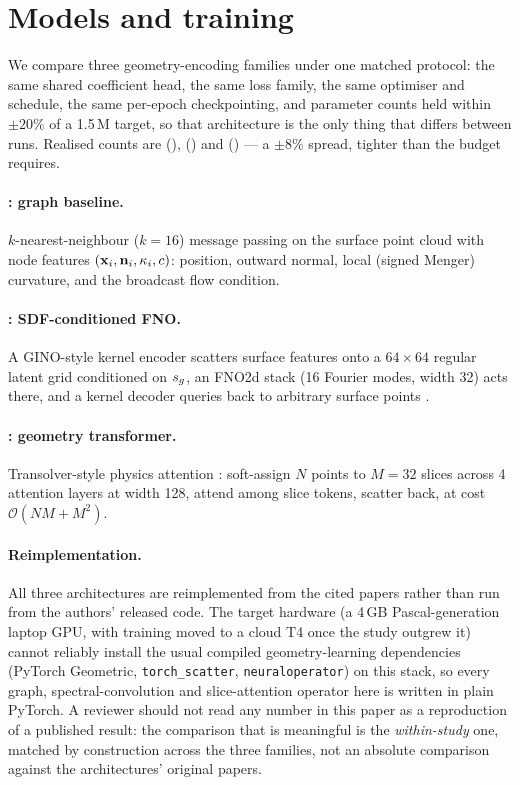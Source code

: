 \documentclass[11pt,a4paper]{article}
\begin{document}
\section{Models and training}
\label{sec:models}

We compare three geometry-encoding families under one matched protocol: the
same shared coefficient head, the same loss family, the same optimiser and
schedule, the same per-epoch checkpointing, and parameter counts held within
$\pm20\%$ of a 1.5\,M target, so that architecture is the only thing that
differs between runs. Realised counts are
 (\Mgnn),  (\Mfno) and
 (\Mtrans) --- a $\pm8\%$ spread, tighter than the budget
requires.

\paragraph{\Mgnn: graph baseline.} $k$-nearest-neighbour ($k=16$) message
passing on the surface point cloud with node features $(\mathbf{x}_i, \mathbf{n}_i, \kappa_i,
c)$: position, outward normal, local (signed Menger) curvature, and the
broadcast flow condition.

\paragraph{\Mfno: SDF-conditioned FNO.} A GINO-style kernel encoder scatters
surface features onto a $64\times64$ regular latent grid conditioned on
$s_{g}$, an FNO2d stack (16 Fourier modes, width 32) acts there, and a kernel
decoder queries back to arbitrary surface points \citep{li2023gino, li2021fno}.

\paragraph{\Mtrans: geometry transformer.} Transolver-style physics attention
\citep{wu2024transolver}: soft-assign $N$ points to $M=32$ slices across 4
attention layers at width 128, attend among slice tokens, scatter back, at cost
$\mathcal{O}(NM + M^2)$.

\paragraph{Reimplementation.} All three architectures are reimplemented from
the cited papers rather than run from the authors' released code. The target
hardware (a 4\,GB Pascal-generation laptop GPU, with training moved to a cloud
T4 once the study outgrew it) cannot reliably install the usual compiled
geometry-learning dependencies (PyTorch Geometric, \texttt{torch\_scatter},
\texttt{neuraloperator}) on this stack, so every graph, spectral-convolution and
slice-attention operator here is written in plain PyTorch. A reviewer should
not read any number in this paper as a reproduction of a published result:
the comparison that is meaningful is the \emph{within-study} one, matched by
construction across the three families, not an absolute comparison against the
architectures' original papers.
\end{document}
